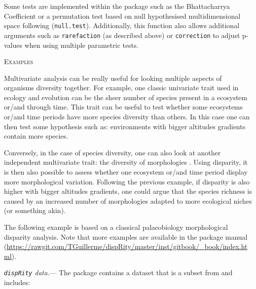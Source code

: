 \documentclass[12pt,letterpaper]{article}
\renewcommand{\section}[1]{%
\bigskip
\begin{center}
\begin{Large}
\normalfont\scshape #1
\medskip
\end{Large}
\end{center}}
\renewcommand{\subsubsection}[1]{%
\vspace{2ex}
\noindent
\textit{#1.}---}
\newcommand{\disp}{\texttt{dispRity} }
\begin{document}
Some tests are implemented within the package such as the Bhattacharrya Coefficient \citep[\texttt{bhatt.coeff};][]{Bhattacharyya,GuillermeCooper} or a permutation test based on null hypothesised multidimensional space following \cite{diaz2016global} (\texttt{null.test}).
Additionally, this function also allows additional arguments such as \texttt{rarefaction} (as described above) or \texttt{correction} to adjust p-values when using multiple parametric tests.

\section{Examples}
Multivariate analysis can be really useful for looking multiple aspects of organisms diversity together.
For example, one classic univariate trait used in ecology and evolution can be the sheer number of species present in a ecosystem or/and through time.
This trait can be useful to test whether some ecosystems or/and time periods have more species diversity than others.
In this case one can then test some hypothesis such as: environments with bigger altitudes gradients contain more species.

Conversely, in the case of species diversity, one can also look at another independent multivariate trait: the diversity of morphologies \citep[or disparity;][]{ruta2013}.
Using disparity, it is then also possible to assess whether one ecosystem or/and time period display more morphological variation.
Following the previous example, if disparity is also higher with bigger altitudes gradients, one could argue that the species richness is caused by an increased number of morphologies adapted to more ecological niches (or something akin).

The following example is based on a classical palaeobiology morphological disparity analysis.
Note that more examples are available in the package manual (\url{https://rawgit.com/TGuillerme/dispRity/master/inst/gitbook/_book/index.html}).

\subsubsection{\disp data}
The package contains a dataset that is a subset from \cite{beckancient2014} and includes:
\end{document}
